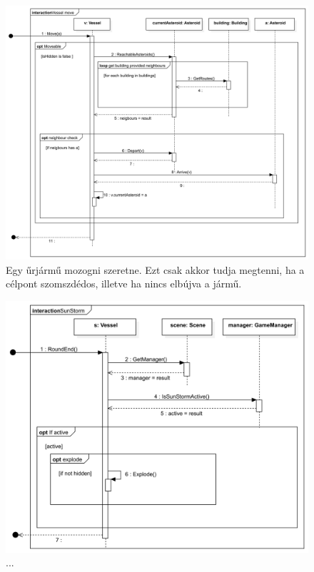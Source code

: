 \begin{figure}[H] 
\centering 
\includegraphics[width=1\textwidth]{docs/3_Project/svg/Design Model!Vessel Actions!Vessel move!Vessel move_17.png} 
\caption{Egy űrjármű mozogni szeretne. Ezt csak akkor tudja megtenni, ha a célpont szomszdédos, illetve ha nincs elbújva a jármű.} 
\end{figure} 

\begin{figure}[H] 
\centering 
\includegraphics[width=1\textwidth]{docs/3_Project/svg/Design Model!Sun storm!Sun Storm!SunStorm_18.png} 
\caption{...} 
\end{figure} 


